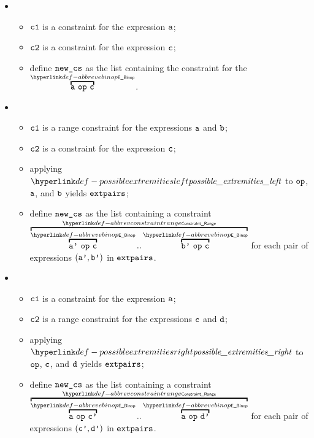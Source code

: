 \ProseParagraph
\OneApplies
\begin{itemize}
  \item {}
  \begin{itemize}
    \item $\texttt{c1}$ is a constraint for the expression $\texttt{a}$;
    \item $\texttt{c2}$ is a constraint for the expression $\texttt{c}$;
    \item define $\texttt{new\_cs}$ as the list containing the constraint for the \binopexpressionterm{} $\AbbrevEBinop{\op}{\va}{\vc}$.
  \end{itemize}

  \item {}
  \begin{itemize}
    \item $\texttt{c1}$ is a range constraint for the expressions $\texttt{a}$ and $\texttt{b}$;
    \item $\texttt{c2}$ is a constraint for the expression $\texttt{c}$;
    \item applying $\possibleextremitiesleft$ to $\texttt{op}$, $\texttt{a}$, and $\texttt{b}$ yields $\texttt{extpairs}$;
    \item define $\texttt{new\_cs}$ as the list containing a constraint $\AbbrevConstraintRange{\AbbrevEBinop{\op}{\vap}{\vc}}{\AbbrevEBinop{\op}{\vbp}{\vc}}$
          for each pair of expressions $(\texttt{a'}, \texttt{b'})$ in $\texttt{extpairs}$.
  \end{itemize}

  \item {}
  \begin{itemize}
    \item $\texttt{c1}$ is a constraint for the expression $\texttt{a}$;
    \item $\texttt{c2}$ is a range constraint for the expressions $\texttt{c}$ and $\texttt{d}$;
    \item applying $\possibleextremitiesright$ to $\texttt{op}$, $\texttt{c}$, and $\texttt{d}$ yields $\texttt{extpairs}$;
    \item define $\texttt{new\_cs}$ as the list containing a constraint $\AbbrevConstraintRange{\AbbrevEBinop{\op}{\va}{\vcp}}{\AbbrevEBinop{\op}{\va}{\vdp}}$
          for each pair of expressions $(\texttt{c'}, \texttt{d'})$ in $\texttt{extpairs}$.
  \end{itemize}


\end{itemize}
